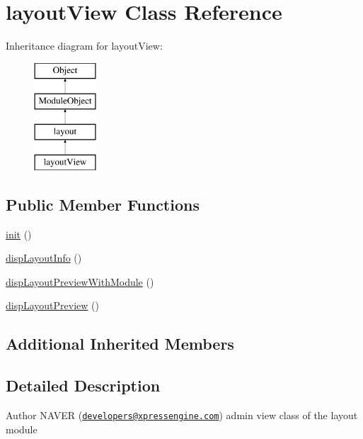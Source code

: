 \hypertarget{classlayoutView}{}\section{layout\+View Class Reference}
\label{classlayoutView}
Inheritance diagram for layout\+View\+:\begin{figure}[H]
\begin{center}
\leavevmode
\includegraphics[height=4.000000cm]{classlayoutView}
\end{center}
\end{figure}
\subsection*{Public Member Functions}
\begin{DoxyCompactItemize}
\item 
\hyperlink{classlayoutView_ad61f59b8dd10b1b97ebfdcf7d9c230da}{init} ()
\item 
\hyperlink{classlayoutView_a7e82f54644ad872c39e708449b6fea29}{disp\+Layout\+Info} ()
\item 
\hyperlink{classlayoutView_a9d6c6bcdcf6ce58534d2f49f3fb89fce}{disp\+Layout\+Preview\+With\+Module} ()
\item 
\hyperlink{classlayoutView_ae61b21bdcf9e655ac2d1dab95ba96519}{disp\+Layout\+Preview} ()
\end{DoxyCompactItemize}
\subsection*{Additional Inherited Members}


\subsection{Detailed Description}
\begin{DoxyAuthor}{Author}
N\+A\+V\+ER (\href{mailto:developers@xpressengine.com}{\tt developers@xpressengine.\+com}) admin view class of the layout module 
\end{DoxyAuthor}


